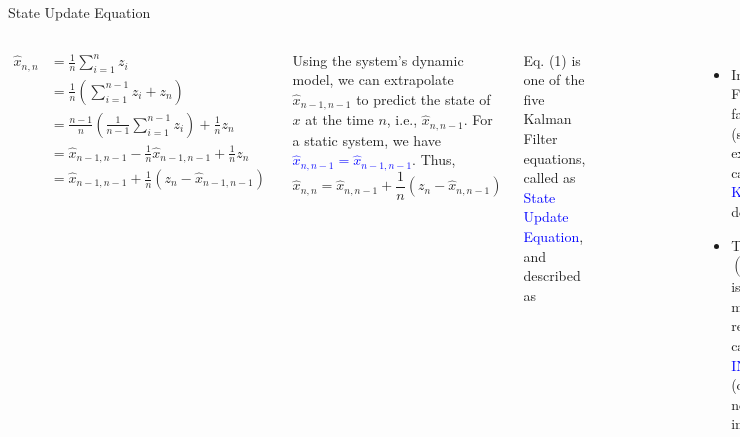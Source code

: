 \begin{frame}{State Update Equation}
    \begin{columns}
        \begin{align*}
            \hat{x}_{n,n} & =  \frac{1}{n}\sum_{i=1}^n z_i \\
                          & =  \frac{1}{n}\left(\sum_{i=1}^{n-1} z_i +z_n \right)\\   
                          & = \frac{n-1}{n}\left(\frac{1}{n-1} \sum_{i=1}^{n-1} z_i\right) +\frac{1}{n}z_n\\
                          & = \hat{x}_{n-1,n-1} - \frac{1}{n} \hat{x}_{n-1,n-1} +\frac{1}{n}z_n\\
                          & = \hat{x}_{n-1,n-1} + \frac{1}{n} \left(z_n - \hat{x}_{n-1,n-1} \right)
        \end{align*}
        
        Using the system's dynamic model, we can extrapolate $\hat{x}_{n-1,n-1}$ to predict the state of $x$ at the time $n$, i.e., $\hat{x}_{n,n-1}$. For a static system, we have \textcolor{blue}{$\hat{x}_{n,n-1}= \hat{x}_{n-1,n-1}$}. Thus, 
        \vspace{-5pt}
        \begin{equation}
            \boxed{\hat{x}_{n,n} = \hat{x}_{n,n-1} + \frac{1}{n} \left(z_n - \hat{x}_{n,n-1}\right)}
        \end{equation}
        
        
        Eq. (1) is one of the five Kalman Filter equations, called as \textcolor{blue}{State Update Equation}, and described as
        \begin{figure}
		    \centering
		    \includegraphics[width=1\textwidth]{Figures/Chapter1/ex1_stateUpdate.png}
		    \label{fig:ex1_stateUpdate}
	    \end{figure}
        
        \begin{itemize}
            \item In Kalman Filter, the factor $\frac{1}{n}$ (specific to this example) is called as \textcolor{blue}{Kalman Gain}, denoted by $K_n$.
            \item The term $\left(z_n - \hat{x}_{n,n-1}\right)$ is the measurement residual, also called as the \textcolor{blue}{INNOVATION} (containing new information).
            

\end{itemize}
\end{columns}
\end{frame}
